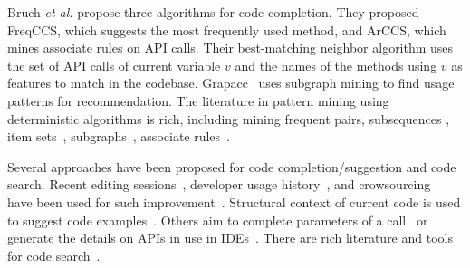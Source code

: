 
\vspace{0.04in}
  Bruch {\em et al.}
\cite{bruch-fse09} propose three algorithms for code completion. They
proposed FreqCCS, which suggests the most frequently used method, and
ArCCS, which mines associate rules on API calls. Their best-matching
neighbor algorithm uses the set of API calls of current variable
$v$ and the names of the methods using $v$ as features to match in
the codebase.
Grapacc~\cite{icse12-grapacc} uses subgraph mining to find
usage patterns for recommendation.
%
The literature in pattern mining using deterministic
algorithms is rich, including mining frequent
pairs, subsequences \cite{zeller07,mapo-fse07,mapo-ecoop09}, item
sets~\cite{bruch-fse09}, subgraphs~\cite{neglected}, associate
rules~\cite{davidlo-ase08}.


Several approaches have been proposed for code completion/suggestion
and code search. Recent editing sessions~\cite{robbes08}, developer
usage history~\cite{mylyn06}, and crowsourcing~\cite{mira14} have been
used for such improvement~\cite{hou-icsm11,denys-rsse10}. 
Structural context of current code is used to suggest code
examples~\cite{strathcona05,hill04}. Others aim to complete parameters
of a call~\cite{zhang-icse12} or generate the details on APIs in use
in IDEs~\cite{omar12}. There are rich literature and tools for code
search~\cite{reiss-icse09,stolee12,reid-icse14,weimer-icse12}.


